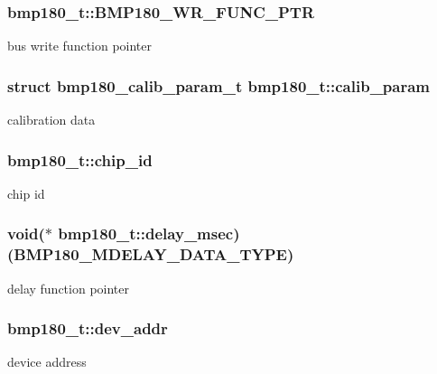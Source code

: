 \subsubsection[{\texorpdfstring{B\+M\+P180\+\_\+\+W\+R\+\_\+\+F\+U\+N\+C\+\_\+\+P\+TR}{BMP180_WR_FUNC_PTR}}]{\setlength{\rightskip}{0pt plus 5cm}bmp180\+\_\+t\+::\+B\+M\+P180\+\_\+\+W\+R\+\_\+\+F\+U\+N\+C\+\_\+\+P\+TR}\hypertarget{structbmp180__t_a423adc61f46263a61285f13c1bb49375}{}\label{structbmp180__t_a423adc61f46263a61285f13c1bb49375}
bus write function pointer 
\subsubsection[{\texorpdfstring{calib\+\_\+param}{calib_param}}]{\setlength{\rightskip}{0pt plus 5cm}struct {\bf bmp180\+\_\+calib\+\_\+param\+\_\+t} bmp180\+\_\+t\+::calib\+\_\+param}\hypertarget{structbmp180__t_af9052e0c95ba7c63157703465ff14ef1}{}\label{structbmp180__t_af9052e0c95ba7c63157703465ff14ef1}
calibration data 
\subsubsection[{\texorpdfstring{chip\+\_\+id}{chip_id}}]{ bmp180\+\_\+t\+::chip\+\_\+id}\hypertarget{structbmp180__t_af41f334824c5e9e6d0bb72507a734dec}{}\label{structbmp180__t_af41f334824c5e9e6d0bb72507a734dec}
chip id 
\subsubsection[{\texorpdfstring{delay\+\_\+msec}{delay_msec}}]{\setlength{\rightskip}{0pt plus 5cm}void($\ast$ bmp180\+\_\+t\+::delay\+\_\+msec) (B\+M\+P180\+\_\+\+M\+D\+E\+L\+A\+Y\+\_\+\+D\+A\+T\+A\+\_\+\+T\+Y\+PE)}\hypertarget{structbmp180__t_ad6875c8bcf81da576a90decbdf0f2a93}{}\label{structbmp180__t_ad6875c8bcf81da576a90decbdf0f2a93}
delay function pointer 
\subsubsection[{\texorpdfstring{dev\+\_\+addr}{dev_addr}}]{ bmp180\+\_\+t\+::dev\+\_\+addr}\hypertarget{structbmp180__t_a1fac092bc595a86dc1dae9604f557d5e}{}\label{structbmp180__t_a1fac092bc595a86dc1dae9604f557d5e}
device address 
